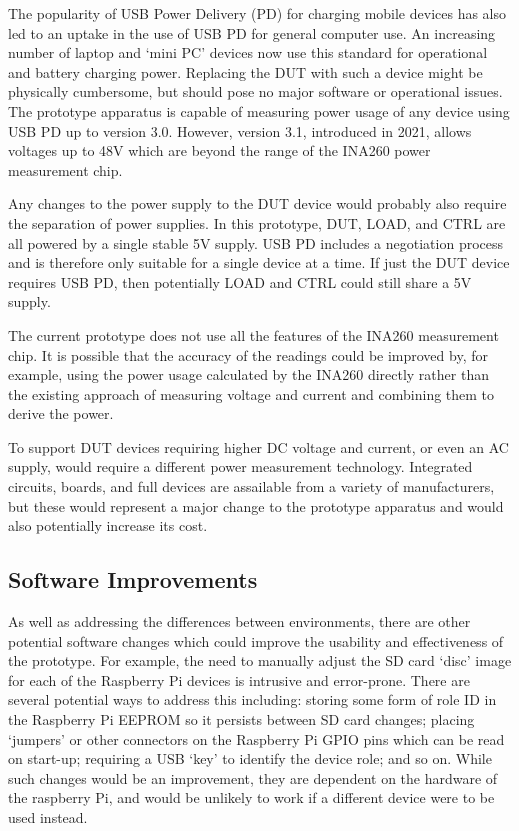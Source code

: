 The popularity of USB Power Delivery (PD) for charging mobile devices has also led to an uptake in the use of USB PD for general computer use. An increasing number of laptop and `mini PC' devices now use this standard for operational and battery charging power. Replacing the DUT with such a device might be physically cumbersome, but should pose no major software or operational issues. The prototype apparatus is capable of measuring power usage of any device using USB PD up to version 3.0. However, version 3.1, introduced in 2021, allows voltages up to 48V which are beyond the range of the INA260 power measurement chip.

Any changes to the power supply to the DUT device would probably also require the separation of power supplies. In this prototype, DUT, LOAD, and CTRL are all powered by a single stable 5V supply. USB PD includes a negotiation process and is therefore only suitable for a single device at a time. If just the DUT device requires USB PD, then potentially LOAD and CTRL could still share a 5V supply.

The current prototype does not use all the features of the INA260 measurement chip. It is possible that the accuracy of the readings could be improved by, for example, using the power usage calculated by the INA260 directly rather than the existing approach of measuring voltage and current and combining them to derive the power.

To support DUT devices requiring higher DC voltage and current, or even an AC supply, would require a different power measurement technology. Integrated circuits, boards, and full devices are assailable from a variety of manufacturers, but these would represent a major change to the prototype apparatus and would also potentially increase its cost.

\subsection{Software Improvements}

As well as addressing the differences between environments, there are other potential software changes which could improve the usability and effectiveness of the prototype. For example, the need to manually adjust the SD card `disc' image for each of the Raspberry Pi devices is intrusive and error-prone. There are several potential ways to address this including: storing some form of role ID in the Raspberry Pi EEPROM so it persists between SD card changes; placing `jumpers' or other connectors on the Raspberry Pi GPIO pins which can be read on start-up; requiring a USB `key' to identify the device role; and so on. While such changes would be an improvement, they are dependent on the hardware of the raspberry Pi, and would be unlikely to work if a different device were to be used instead.

